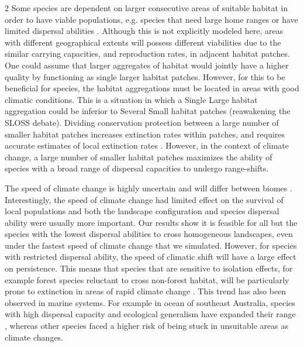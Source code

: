 \documentclass[12pt,pdftex]{article}
\begin{document}
\begin{spacing}{2}
Some species are dependent on larger consecutive areas of suitable habitat in order to have viable populations, e.g. species that need large home ranges or have limited dispersal abilities \citep{Lindenmayer2013, Hanski2011}. Although this is not explicitly modeled here, areas with different geographical extents will possess different viabilities due to the similar carrying capacities, and reproduction rates, in adjacent habitat patches. One could assume that larger aggregates of habitat would jointly have a higher quality by functioning as single larger habitat patches. However, for this to be beneficial for species, the habitat aggregations must be located in areas with good climatic conditions. This is a situation in which a Single Large habitat aggregation could be inferior to Several Small habitat patches (reawakening the SLOSS debate).  Dividing conservation protection between a large number of smaller habitat patches increases extinction rates within patches, and requires accurate estimates of local extinction rates \citep{McCarthy2011, Donaldson2017}. However, in the context of climate change, a large number of smaller habitat patches maximizes the ability of species with a broad range of dispersal capacities to undergo range-shifts. 

 
The speed of climate change is highly uncertain \citep{Stocker2013} and will differ between biomes \citep{Loarie2009}. Interestingly, the speed of climate change had limited effect on the survival of local populations and both the landscape configuration and species dispersal ability were usually more important. Our results show it is feasible for all but the species with the lowest dispersal abilities to cross homogeneous landscapes, even under the fastest speed of climate change that we simulated. However, for species with restricted dispersal ability, the speed of climatic shift will have a large effect on persistence. This means that species that are sensitive to isolation effects, for example forest species reluctant to cross non-forest habitat, will be particularly prone to extinction in areas of rapid climate change \citep{Melles2011}. This trend has also been observed in marine systems. For example in ocean of southeast Australia, species with high dispersal capacity and ecological generalism have expanded their range \citep{Sunday2015}, whereas other species faced a higher risk of being stuck in unsuitable areas as climate changes.



\end{spacing}
\end{document}
